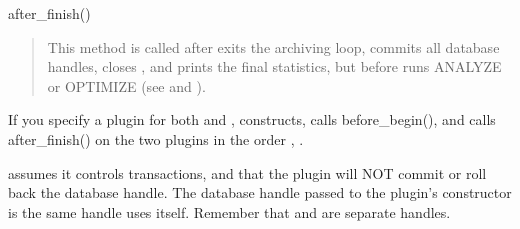 \documentclass[letterpaper,10pt,english]{sphinxmanual}
\begin{document}
after\_finish()
\begin{quote}

This method is called after  exits the archiving loop, commits all
database handles, closes {\hyperref[\detokenize{mariadb-archiver:cmdoption-mariadb-archiver-file}]{}}, and prints the final statistics, but
before  runs ANALYZE or OPTIMIZE (see {\hyperref[\detokenize{mariadb-archiver:cmdoption-mariadb-archiver-analyze}]{}} and
{\hyperref[\detokenize{mariadb-archiver:cmdoption-mariadb-archiver-optimize}]{}}).
\end{quote}

If you specify a plugin for both {\hyperref[\detokenize{mariadb-archiver:cmdoption-mariadb-archiver-source}]{}} and {\hyperref[\detokenize{mariadb-archiver:cmdoption-mariadb-archiver-dest}]{}}, 
constructs, calls before\_begin(), and calls after\_finish() on the two plugins in
the order {\hyperref[\detokenize{mariadb-archiver:cmdoption-mariadb-archiver-source}]{}}, {\hyperref[\detokenize{mariadb-archiver:cmdoption-mariadb-archiver-dest}]{}}.

 assumes it controls transactions, and that the plugin will NOT
commit or roll back the database handle.  The database handle passed to the
plugin’s constructor is the same handle  uses itself.  Remember
that {\hyperref[\detokenize{mariadb-archiver:cmdoption-mariadb-archiver-source}]{}} and {\hyperref[\detokenize{mariadb-archiver:cmdoption-mariadb-archiver-dest}]{}} are separate handles.
\end{document}
